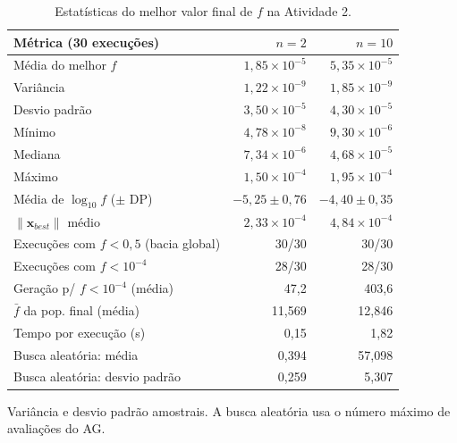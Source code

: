 \begin{table}[!t]
\centering
\footnotesize
\setlength{\tabcolsep}{4pt}
\caption{Estatísticas do melhor valor final de $f$ na Atividade 2.}
\label{tab:a2_stats}
\begin{tabular}{@{}lrr@{}}
\toprule
Métrica (30 execuções) & $n=2$ & $n=10$ \\
\midrule
Média do melhor $f$ & $1{,}85\times10^{-5}$ & $5{,}35\times10^{-5}$ \\
Variância & $1{,}22\times10^{-9}$ & $1{,}85\times10^{-9}$ \\
Desvio padrão & $3{,}50\times10^{-5}$ & $4{,}30\times10^{-5}$ \\
Mínimo & $4{,}78\times10^{-8}$ & $9{,}30\times10^{-6}$ \\
Mediana & $7{,}34\times10^{-6}$ & $4{,}68\times10^{-5}$ \\
Máximo & $1{,}50\times10^{-4}$ & $1{,}95\times10^{-4}$ \\
Média de $\log_{10} f$ ($\pm$ DP) & $-5{,}25 \pm 0{,}76$ & $-4{,}40 \pm 0{,}35$ \\
$\|\mathbf{x}_{best}\|$ médio & $2{,}33\times10^{-4}$ & $4{,}84\times10^{-4}$ \\
Execuções com $f<0{,}5$ (bacia global) & 30/30 & 30/30 \\
Execuções com $f<10^{-4}$ & 28/30 & 28/30 \\
Geração p/ $f<10^{-4}$ (média) & 47{,}2 & 403{,}6 \\
$\bar f$ da pop. final (média) & 11{,}569 & 12{,}846 \\
Tempo por execução (s) & 0{,}15 & 1{,}82 \\
\midrule
Busca aleatória: média & 0{,}394 & 57{,}098 \\
Busca aleatória: desvio padrão & 0{,}259 & 5{,}307 \\
\bottomrule
\end{tabular}
\par\smallskip\parbox{0.95\linewidth}{\scriptsize Variância e desvio padrão amostrais. A busca aleatória usa o número máximo de avaliações do AG.}
\end{table}
